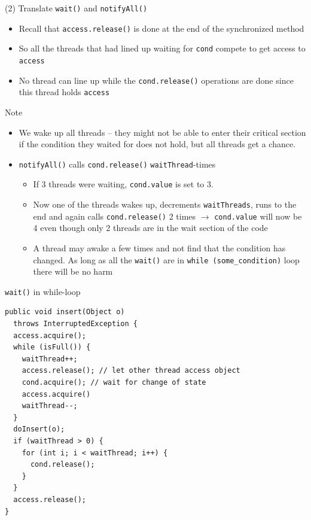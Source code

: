 \begin{frame}{(2) Translate \lstinline!wait()! and \lstinline!notifyAll()!}
  \begin{itemize}
  \item Recall that \lstinline!access.release()! is done at the end of
    the synchronized method
  \item So all the threads that had lined up waiting for
    \lstinline!cond! compete to get access to \lstinline!access!
  \item No thread can line up while the \lstinline!cond.release()!
    operations are done since this thread holds \lstinline!access!
  \end{itemize}
\end{frame}

\begin{frame}{Note}
  \begin{itemize}
  \item We wake up all threads -- they might not be able to enter
    their critical section if the condition they waited for does not
    hold, but all threads get a chance.
  \item \lstinline!notifyAll()! calls \lstinline!cond.release()!
    \lstinline!waitThread!-times
    \begin{itemize}
    \item If 3 threads were waiting, \lstinline!cond.value! is set to 3.
    \item Now one of the threads wakes up, decrements
      \lstinline!waitThreads!, runs to the end and again calls
      \lstinline!cond.release()! 2 times $\rightarrow$
      \lstinline!cond.value! will now be 4 even though only 2 threads
      are in the wait section of the code
    \item A thread may awake a few times and not find that the
      condition has changed. As long as all the \lstinline!wait()! are
      in \lstinline!while (some_condition)! loop there will be no harm
    \end{itemize}
  \end{itemize}
\end{frame}

\begin{frame}[fragile]{\lstinline!wait()! in while-loop}
\begin{lstlisting}[basicstyle=\fontsize{9}{11}\selectfont\ttfamily]
public void insert(Object o) 
  throws InterruptedException {
  access.acquire();
  while (isFull()) {
    waitThread++;
    access.release(); // let other thread access object
    cond.acquire(); // wait for change of state
    access.acquire()
    waitThread--;
  }
  doInsert(o);	
  if (waitThread > 0) { 
    for (int i; i < waitThread; i++) {
      cond.release(); 
    } 
  }
  access.release(); 
}
\end{lstlisting}
\end{frame}


